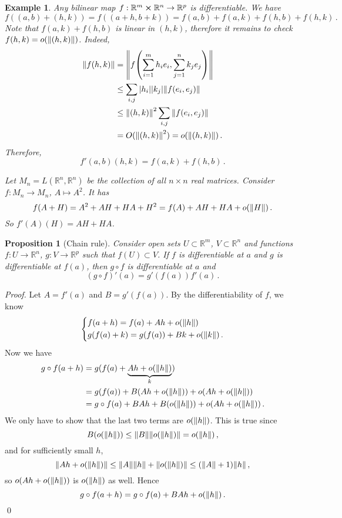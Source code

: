 \documentclass{article}
\theoremstyle{plain}\theoremheaderfont{\normalfont\itshape}\theorembodyfont{\rmfamily}\theoremseparator{.}\newtheorem*{rem}{Remark}\newtheorem*{ex}{Example}\newtheorem*{proof}{Proof}\newtheorem*{altp}{Alternative proof}
\theoremstyle{plain}\theoremheaderfont{\normalfont\bfseries}\theorembodyfont{\rmfamily}\theoremseparator{.}\newtheorem{thm}{Theorem}[section]\newtheorem{lem}[thm]{Lemma}\newtheorem{prop}[thm]{Proposition}\newtheorem*{cor}{Corollary}\newtheorem{defn}[thm]{Definition}\newtheorem{clm}[thm]{Claim}\newtheorem{clminproof}{Claim}
\theoremstyle{break}\theoremheaderfont{\normalfont\itshape}\theorembodyfont{\rmfamily}\theoremseparator{.\medskip}\newtheorem*{proofskip}{Proof}\newtheorem*{exs}{Examples}\newtheorem*{rems}{Remarks}
\theoremstyle{break}\theoremheaderfont{\normalfont\bfseries}\theorembodyfont{\rmfamily}\theoremseparator{.\medskip}\newtheorem{lemskip}[thm]{Lemma}\newtheorem{defnskip}[thm]{Definition}\newtheorem{propskip}[thm]{Proposition}\newtheorem{thmskip}[thm]{Theorem}
\newcommand{\qed}{\hfill\ensuremath{\Box}}
\begin{document}
    \begin{ex}
        Any bilinear map \(f:\mathbb{R}^m\cross\mathbb{R}^n\to\mathbb{R}^p\) is differentiable. We have
            \[f((a,b)+(h,k))=f((a+h,b+k))=f(a,b)+f(a,k)+f(h,b)+f(h,k)\,.\]
            Note that \(f(a,k)+f(h,b)\) is linear in \((h,k)\), therefore it remains to check \(f(h,k)=o(\norm{(h,k)})\). Indeed,
            \begin{align*}
                \norm{f(h,k)}&=\norm{f\qty(\sum_{i=1}^{m}h_ie_i,\sum_{j=1}^{n}k_je_j)}\\
                &\le\sum_{i,j}\abs{h_i}\abs{k_j}\norm{f(e_i,e_j)}\\
                &\le\norm{(h,k)}^2\sum_{i,j}\norm{f(e_i,e_j)}\\
                &=O(\norm{(h,k)}^2)=o(\norm{(h,k)})\,.
            \end{align*}
            Therefore,
            \[f'(a,b)(h,k)=f(a,k)+f(h,b)\,.\]
            \item Let \(M_n=L(\mathbb{R}^n,\mathbb{R}^n)\) be the collection of all \(n\times n\) real matrices. Consider \(f:M_n\to M_n\), \(A\mapsto A^2\). It has
            \[f(A+H)=A^2+AH+HA+H^2=f(A)+AH+HA+o(\norm{H})\,.\]
            So \(f'(A)(H)=AH+HA\).
    \end{ex}
    \begin{prop}[Chain rule]
        Consider open sets \(U\subset\mathbb{R}^m\), \(V\subset\mathbb{R}^n\) and functions \(f:U\to\mathbb{R}^n\), \(g:V\to\mathbb{R}^p\) such that \(f(U)\subset V\). If \(f\) is differentiable at \(a\) and \(g\) is differentiable at \(f(a)\), then \(g\circ f\) is differentiable at \(a\) and
        \[(g\circ f)'(a)=g'(f(a))f'(a)\,.\]
    \end{prop}
    \begin{proof}
        Let \(A=f'(a)\) and \(B=g'(f(a))\). By the differentiability of \(f\), we know
        \[\begin{cases*}
            f(a+h)=f(a)+Ah+o(\norm{h})\\
            g(f(a)+k)=g(f(a))+Bk+o(\norm{k})\,.
        \end{cases*}\]
        Now we have
        \begin{align*}
            g\circ f(a+h)&=g(f(a)+\underbrace{Ah+o(\norm{h})}_{k})\\
            &=g(f(a))+B(Ah+o(\norm{h}))+o(Ah+o(\norm{h}))\\
            &=g\circ f(a)+BAh+B(o(\norm{h}))+o(Ah+o(\norm{h}))\,.
        \end{align*}
        We only have to show that the last two terms are \(o(\norm{h})\). This is true since
        \[B(o(\norm{h}))\le\norm{B}\norm{o(\norm{h})}=o(\norm{h})\,,\]
        and for sufficiently small \(h\),
        \[\norm{Ah+o(\norm{h})}\le\norm{A}\norm{h}+\norm{o(\norm{h})}\le(\norm{A}+1)\norm{h}\,,\]
        so \(o(Ah+o(\norm{h}))\) is \(o(\norm{h})\) as well. Hence
        \[g\circ f(a+h)=g\circ f(a)+BAh+o(\norm{h})\,.\]\qed
    \end{proof}
\end{document}
